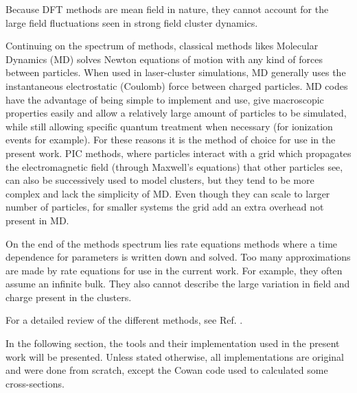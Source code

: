 Because DFT methods are mean field in nature, they cannot account for the large
field fluctuations seen in strong field cluster dynamics.

Continuing on the spectrum of methods, classical methods likes Molecular
Dynamics (MD) solves Newton
equations of motion with any kind of forces between particles. When used in
laser-cluster simulations, MD generally uses the instantaneous electrostatic
(Coulomb) force between charged particles. MD codes have the advantage of being
simple to implement and use, give macroscopic properties easily and allow a
relatively large amount of particles to be simulated, while still allowing
specific quantum treatment when necessary (for ionization events for example). For
these reasons it is the method of choice for use in the present work. PIC
methods, where particles interact with a grid which propagates the
electromagnetic field (through Maxwell's equations) that other particles see,
can also be successively used to model clusters\cite{Varin2012}, but they tend
to be more complex and lack the simplicity of MD. Even though they can scale to
larger number of particles, for smaller systems the grid add an extra overhead
not present in MD.

On the end of the methods spectrum lies rate equations methods where a time
dependence for parameters is written down and solved. Too many approximations
are made by rate equations for use in the current work. For example, they often
assume an infinite bulk. They also cannot describe the large variation in field
and charge present in the clusters.

For a detailed review of the different methods, see Ref. \cite{Fennel2010}.

In the following section, the tools and their implementation used in the present
work will be presented. Unless stated otherwise, all implementations are original
and were done from scratch, except the Cowan code\cite{CowanCode} used to
calculated some cross-sections.








